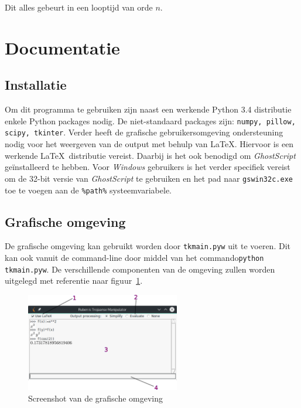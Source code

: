 \documentclass[a4paper]{article}
\begin{document}
Dit alles gebeurt in een looptijd van orde $n$. 

\section{Documentatie}
\subsection{Installatie}
Om dit programma te gebruiken zijn naast een werkende Python 3.4 distributie enkele Python packages nodig. De niet-standaard packages zijn: \texttt{numpy, pillow, scipy, tkinter}.
Verder heeft de grafische gebruikersomgeving ondersteuning nodig voor het weergeven van de output met behulp van \LaTeX. Hiervoor is een werkende \LaTeX~distributie vereist. Daarbij is het ook benodigd om \emph{GhostScript} ge\"installeerd te hebben. Voor \emph{Windows} gebruikers is het verder specifiek vereist om de 32-bit versie van \emph{GhostScript} te gebruiken en het pad naar \texttt{gswin32c.exe} toe te voegen aan de \texttt{\%path\%} systeemvariabele.

\subsection{Grafische omgeving}
De grafische omgeving kan gebruikt worden door \texttt{tkmain.pyw} uit te voeren. Dit kan ook vanuit de command-line door middel van het commando\texttt{python tkmain.pyw}.  De verschillende componenten van de omgeving zullen worden uitgelegd met referentie naar figuur~\ref{fig:screenshot}.

\begin{figure}[!htb]
  \centering
  \includegraphics[width=0.6\textwidth]{screenshot.png}
  \caption{Screenshot van de grafische omgeving}
  \label{fig:screenshot}
\end{figure}
\end{document}
